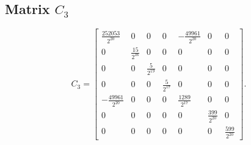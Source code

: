 \subsection{Matrix $C_3$}
\[C_3=\left[\begin{array}{ccccccc}
\frac{252053}{2^{20}} & 0 & 0 & 0 & -\frac{49961}{2^{20}} & 0 & 0\\
0 & \frac{15}{2^{16}} & 0 & 0 & 0 & 0 & 0\\
0 & 0 & \frac{5}{2^{19}} & 0 & 0 & 0 & 0\\
0 & 0 & 0 & \frac{5}{2^{17}} & 0 & 0 & 0\\
-\frac{49961}{2^{20}} & 0 & 0 & 0 & \frac{1289}{2^{17}} & 0 & 0\\
0 & 0 & 0 & 0 & 0 & \frac{399}{2^{20}} & 0\\
0 & 0 & 0 & 0 & 0 & 0 & \frac{599}{2^{20}}
\end{array}\right].\]
